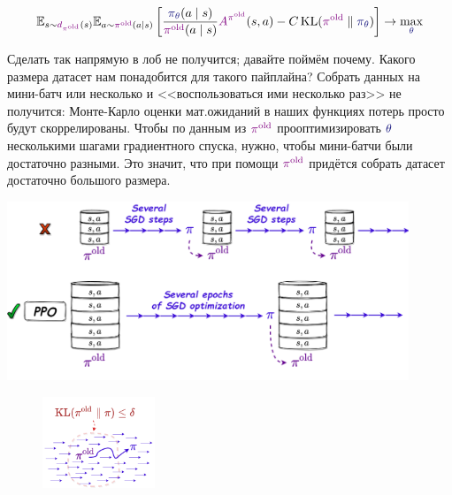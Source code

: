 \begin{equation}\label{lowerboundunconstrained}
\E_{s \sim \textcolor{ChadPurple}{d_{\pi^{\old}}}(s)} \E_{a \sim \textcolor{ChadPurple}{\pi^{\old}}(a \mid s)} \left[ \frac{\textcolor{ChadBlue}{\pi_\theta}(a \mid s)}{\textcolor{ChadPurple}{\pi^{\old}}(a \mid s)} \textcolor{ChadPurple}{A^{\pi^{\old}}}(s, a) - C \KL(\textcolor{ChadPurple}{\pi^{\old}} \parallel \textcolor{ChadBlue}{\pi_\theta}) \right] \to \max_{\textcolor{ChadBlue}{\theta}}
\end{equation}

Сделать так напрямую в лоб не получится; давайте поймём почему. Какого размера датасет нам понадобится для такого пайплайна? Собрать данных на мини-батч или несколько и <<воспользоваться ими несколько раз>> не получится: Монте-Карло оценки мат.ожиданий в наших функциях потерь просто будут скоррелированы. Чтобы по данным из $\textcolor{ChadPurple}{\pi^{\old}}$ прооптимизировать $\textcolor{ChadBlue}{\theta}$ несколькими шагами градиентного спуска, нужно, чтобы мини-батчи были достаточно разными. Это значит, что при помощи $\textcolor{ChadPurple}{\pi^{\old}}$ придётся собрать датасет достаточно большого размера.

\vspace{0.4cm}
\begin{center}
\includegraphics[width=0.9\textwidth]{Images/PPOpipeline2.png}
\end{center}

\begin{figure}
\vspace{-0.5cm}
\centering
\includegraphics[width=0.3\textwidth]{Images/TrustRegion1.png}
\vspace{-0.5cm}
\end{figure}

